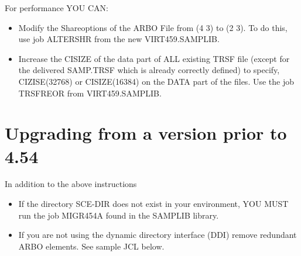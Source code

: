\documentclass[letterpaper,10pt,english]{sphinxmanual}
\begin{document}
For performance YOU CAN:
\begin{itemize}
\item {} 
Modify the Shareoptions of the ARBO File from (4 3) to (2 3). To do this, use job ALTERSHR from the new VIRT459.SAMPLIB.

\item {} 
Increase the CISIZE of the data part of ALL existing TRSF file (except for the delivered SAMP.TRSF which is already correctly defined) to specify, CIZISE(32768) or CISIZE(16384) on the DATA part of the files. Use the job TRSFREOR from VIRT459.SAMPLIB.

\end{itemize}

\ignorespaces 

\section{Upgrading from a version prior to 4.54}
\label{\detokenize{Migration_Guide:upgrading-from-a-version-prior-to-4-54}}\label{\detokenize{Migration_Guide:index-4}}
In addition to the above instructions
\begin{itemize}
\item {} 
If the directory SCE-DIR does not exist in your environment, YOU MUST run the job MIGR454A found in the SAMPLIB library.

\item {} 
If you are not using the dynamic directory interface (DDI) remove redundant ARBO elements. See sample JCL below.

\end{itemize}
\end{document}

